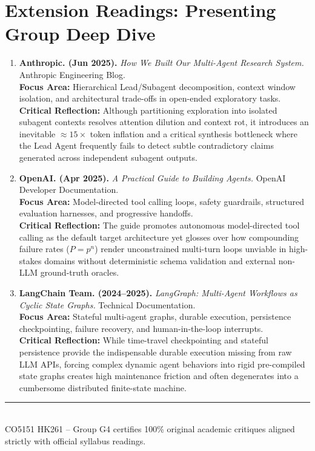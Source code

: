\documentclass[10pt,a4paper]{article}
\begin{document}
\section{Extension Readings: Presenting Group Deep Dive}
\begin{enumerate}[leftmargin=1.4em, itemsep=6pt, topsep=3pt, start=2]
  \item \textbf{Anthropic. (Jun 2025).} \textit{How We Built Our Multi-Agent Research System.} Anthropic Engineering Blog.\\
  \textbf{Focus Area:} Hierarchical Lead/Subagent decomposition, context window isolation, and architectural trade-offs in open-ended exploratory tasks.\\
  \textcolor{critiquecolor}{\textbf{Critical Reflection:}} Although partitioning exploration into isolated subagent contexts resolves attention dilution and context rot, it introduces an inevitable $\approx 15\times$ token inflation and a critical synthesis bottleneck where the Lead Agent frequently fails to detect subtle contradictory claims generated across independent subagent outputs.

  \item \textbf{OpenAI. (Apr 2025).} \textit{A Practical Guide to Building Agents.} OpenAI Developer Documentation.\\
  \textbf{Focus Area:} Model-directed tool calling loops, safety guardrails, structured evaluation harnesses, and progressive handoffs.\\
  \textcolor{critiquecolor}{\textbf{Critical Reflection:}} The guide promotes autonomous model-directed tool calling as the default target architecture yet glosses over how compounding failure rates ($P = p^n$) render unconstrained multi-turn loops unviable in high-stakes domains without deterministic schema validation and external non-LLM ground-truth oracles.

  \item \textbf{LangChain Team. (2024--2025).} \textit{LangGraph: Multi-Agent Workflows as Cyclic State Graphs.} Technical Documentation.\\
  \textbf{Focus Area:} Stateful multi-agent graphs, durable execution, persistence checkpointing, failure recovery, and human-in-the-loop interrupts.\\
  \textcolor{critiquecolor}{\textbf{Critical Reflection:}} While time-travel checkpointing and stateful persistence provide the indispensable durable execution missing from raw LLM APIs, forcing complex dynamic agent behaviors into rigid pre-compiled state graphs creates high maintenance friction and often degenerates into a cumbersome distributed finite-state machine.
\end{enumerate}

\vspace{0.4cm}
\begin{center}
  \rule{0.6\textwidth}{0.4pt}\\[0.06cm]
  {\tiny \color{darkgray}CO5151 HK261 -- Group G4 certifies 100\% original academic critiques aligned strictly with official syllabus readings.}
\end{center}
\end{document}
